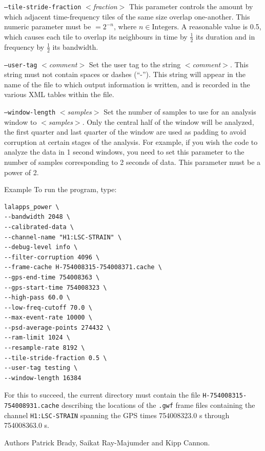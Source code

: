 \documentclass{article}
\newcommand{\option}[1]{\texttt{#1}}
\newcommand{\parm}[1]{$<$\textit{#1}$>$}
\newenvironment{entry}%
  {\begin{list}{}{\renewcommand{\makelabel}[1]%
    {\parbox[b]{\labelwidth}{\makebox[0pt][l]{\textbf{##1}}\\}}%
    \setlength{\labelwidth}{1em}%
    \setlength{\labelsep}{1em}%
    \setlength{\leftmargin}{2em}%
    \setlength{\topsep}{\medskipamount}%
    \setlength{\itemsep}{\medskipamount}%
    \setlength{\parsep}{\medskipamount}%
    \setlength{\listparindent}{0pt}}}
  {\end{list}}
\begin{document}
\begin{entry}
\begin{entry}
\item[\option{--tile-stride-fraction} \parm{fraction}]
This parameter controls the amount by which adjacent time-frequency tiles
of the same size overlap one-another.  This numeric parameter must be \(=
2^{-n}\), where \(n \in \mathrm{Integers}\).  A reasonable value is 0.5,
which causes each tile to overlap its neighbours in time by \(\frac{1}{2}\)
its duration and in frequency by \(\frac{1}{2}\) its bandwidth.

\item[\option{--user-tag} \parm{comment}]
Set the user tag to the string \parm{comment}.  This string must not
contain spaces or dashes (``-'').  This string will appear in the name of
the file to which output information is written, and is recorded in the
various XML tables within the file.

\item[\option{--window-length} \parm{samples}]
Set the number of samples to use for an analysis window to \parm{samples}.
Only the central half of the window will be analyzed, the first quarter and
last quarter of the window are used as padding to avoid corruption at
certain stages of the analysis.  For example, if you wish the code to
analyze the data in 1 second windows, you need to set this parameter to the
number of samples corresponding to 2 seconds of data.  This parameter must
be a power of 2.

\end{entry}


\item[Example]
To run the program, type:
\begin{verbatim}
lalapps_power \
--bandwidth 2048 \
--calibrated-data \
--channel-name "H1:LSC-STRAIN" \
--debug-level info \
--filter-corruption 4096 \
--frame-cache H-754008315-754008371.cache \
--gps-end-time 754008363 \
--gps-start-time 754008323 \
--high-pass 60.0 \
--low-freq-cutoff 70.0 \
--max-event-rate 10000 \
--psd-average-points 274432 \
--ram-limit 1024 \
--resample-rate 8192 \
--tile-stride-fraction 0.5 \
--user-tag testing \
--window-length 16384
\end{verbatim}
For this to succeed, the current directory must contain the file
\texttt{H-754008315-754008931.cache} describing the locations of the
\texttt{.gwf} frame files containing the channel \verb|H1:LSC-STRAIN|
spanning the GPS times 754008323.0 s through 754008363.0 s.

\item[Authors]
Patrick Brady, Saikat Ray-Majumder and Kipp Cannon.  
\end{entry}
\end{document}

